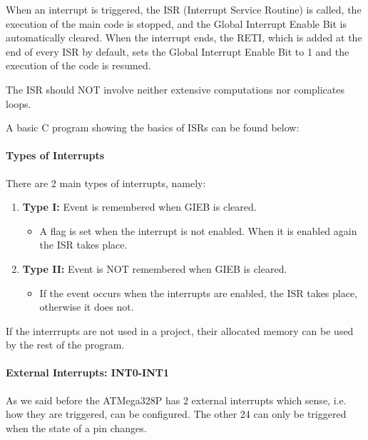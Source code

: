 \clearpage

When an interrupt is triggered, the ISR (Interrupt Service Routine) is called, the execution of the main code is stopped, and the Global Interrupt Enable Bit is automatically cleared. When the interrupt ends, the RETI, which is added at the end of every ISR by default, sets the Global Interrupt Enable Bit to 1 and the execution of the code is resumed. \medskip

The ISR should NOT involve neither extensive computations nor complicates loops.\medskip

A basic C program showing the basics of ISRs can be found below:



\paragraph{Types of Interrupts}

There are 2 main types of interrupts, namely:

\begin{enumerate}
    \item \textbf{Type I:} Event is remembered when GIEB is cleared.
        \begin{itemize}
            \item A flag is set when the interrupt is not enabled. When it is enabled again the ISR takes place.
        \end{itemize}

    \item \textbf{Type II:} Event is NOT remembered when GIEB is cleared.
        \begin{itemize}
            \item If the event occurs when the interrupts are enabled, the ISR takes place, otherwise it does not.
        \end{itemize}
\end{enumerate}

If the interrrupts are not used in a project, their allocated memory can be used by the rest of the program.~\autocite{SLIDES_MICROS}


\paragraph{External Interrupts: INT0-INT1}

As we said before the ATMega328P has 2 external interrupts which sense, i.e. how they are triggered, can be configured. The other 24 can only be triggered when the state of a pin changes.\medskip

